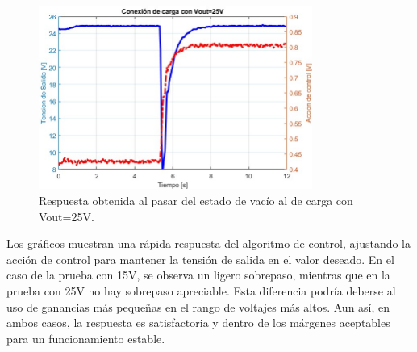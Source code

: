 \begin{figure}[htbp]
    \centering
    \includegraphics[width=0.8\textwidth]{./imagenes/Conexion1.jpg}
    \caption{Respuesta obtenida al pasar del estado de vacío al de carga con Vout=25V.}
    \label{F:Conexion25}
\end{figure}\par 

Los gráficos muestran una rápida respuesta del algoritmo de control, ajustando la acción de control para mantener la tensión de salida en el valor deseado. En el caso de la prueba con 15V, se observa un ligero sobrepaso, mientras que en la prueba con 25V no hay sobrepaso apreciable. Esta diferencia podría deberse al uso de ganancias más pequeñas en el rango de voltajes más altos. Aun así, en ambos casos, la respuesta es satisfactoria y dentro de los márgenes aceptables para un funcionamiento estable. \par


